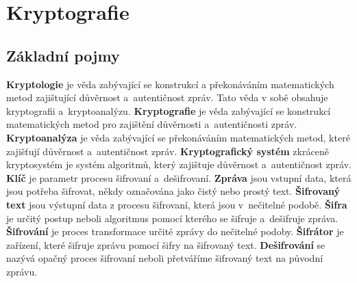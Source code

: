 \chapter{Kryptografie}
\section{Základní pojmy}
\textbf{Kryptologie} je věda zabývající se konstrukcí a překonáváním matematických metod zajištující důvěrnost a~autentičnost zpráv. Tato věda v sobě obsahuje kryptografii a~kryptoanalýzu.\newline
\textbf{Kryptografie} je věda zabývající se konstrukcí matematických metod pro zajištění důvěrnosti a~autentičnosti zpráv.\newline %
\textbf{Kryptoanalýza} je věda zabývající se překonáváním matematických metod, které zajišťují důvěrnost a~autentičnost zpráv.\newline %
\textbf{Kryptografický systém} zkráceně kryptosystém je systém algoritmů, který zajištuje důvěrnost a~autentičnost zpráv.\cite{Burda9788021446120ISBN}\newline
\textbf{Klíč} je parametr procesu šifrovaní a~dešifrovaní.\cite{Burda9788072049257ISBN}\newline %
\textbf{Zpráva} jsou vstupní data, která jsou potřeba šifrovat, někdy označována jako čistý nebo prostý text.\cite{Mao0130669431ISBN}\newline %
\textbf{Šifrovaný text} jsou výstupní data z procesu šifrovaní, která jsou v~nečitelné podobě.\newline %
\textbf{Šifra} je určitý postup neboli algoritmus pomocí kterého se šifruje a~dešifruje zpráva.\cite{Burda9788072049257ISBN}\newline
\textbf{Šifrování} je proces transformace určité zprávy do nečitelné podoby.\cite{Mao0130669431ISBN}\newline %
\textbf{Šifrátor} je zařízení, které šifruje zprávu pomocí šifry na šifrovaný text.\newline
\textbf{Dešifrování} se nazývá opačný proces šifrovaní neboli přetváříme šifrovaný text na původní zprávu.\cite{Mao0130669431ISBN} %
